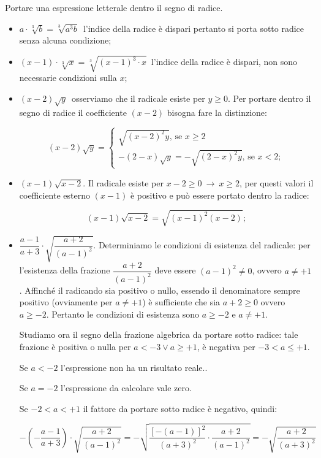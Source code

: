 \begin{esempi}{}{}
Portare una espressione letterale dentro il segno di radice.
\begin{itemize}
\item \(a\cdot \sqrt[3]b=\sqrt[3]{a^3b}\)\, l'indice della radice è dispari 
pertanto si porta sotto radice senza alcuna condizione;
\item \((x-1)\cdot \sqrt[3]x=\sqrt[3]{(x-1)^3\cdot x}\)\, l'indice della 
radice è dispari, non sono necessarie condizioni sulla \(x\);
\item \((x-2)\sqrt y\)\, osserviamo che il radicale esiste per 
\(y \geqslant 0\).
Per portare dentro il segno di radice il coefficiente \((x-2)\) bisogna 
fare la distinzione:

\vspace{-1em}
\[
(x-2)\sqrt y=\left\{\begin{array}{l}\sqrt{(x-2)^2y}\text{, se }
x \geqslant 2\\
-(2-x)\sqrt y=-\sqrt{(2-x)^2y}\text{, se }x < 2;\end{array}\right.
\]
\item \((x-1)\sqrt{x-2}\). 
Il radicale esiste per \(x-2 \geqslant 0\ \to \ x \geqslant 2\), 
per questi valori il coefficiente esterno \((x-1)\) è positivo e può essere 
portato dentro la radice: 

\vspace{-1em}
\[(x-1)\sqrt{x-2}=\sqrt{(x-1)^2(x-2)};\]
\item \(\dfrac{a-1}{a+3}\cdot \sqrt{\dfrac{a+2}{(a-1)^2}}\). Determiniamo 
le condizioni di esistenza del radicale: per l'esistenza della frazione 
\(\dfrac{a+2}{(a-1)^2}\) deve essere \((a-1)^2\neq 0\), ovvero \(a\neq +1\). 
Affinché il radicando sia positivo o nullo, essendo il denominatore 
sempre positivo (ovviamente per \(a\neq +1\)) è sufficiente che sia 
\(a+2 \geqslant 0\) ovvero \(a \geqslant -2\). 
Pertanto le condizioni di esistenza sono \(a \geqslant -2\) e \(a \neq +1\).

Studiamo ora il segno della frazione algebrica da portare sotto radice: 
tale frazione è positiva o nulla per \(a < -3\vee a \geqslant +1\), 
è negativa per \(-3 < a\leqslant +1\).

Se \(a < -2\) l'espressione non ha un risultato reale..

Se \(a = -2\) l'espressione da calcolare vale zero.

Se \(-2 < a < +1\) il fattore da portare sotto radice è negativo, quindi:

\vspace{-1em}
\[-\left(-\dfrac{a-1}{a+3}\right)\cdot \sqrt{\dfrac{a+2}{(a-1)^2}}=
  -\sqrt{\dfrac{[-(a-1)]^2}{(a+3)^2}\cdot \dfrac{a+2}{(a-1)^2}}=
  -\sqrt{\dfrac{a+2}{(a+3)^2}}\]


\end{itemize}
\end{esempi}
